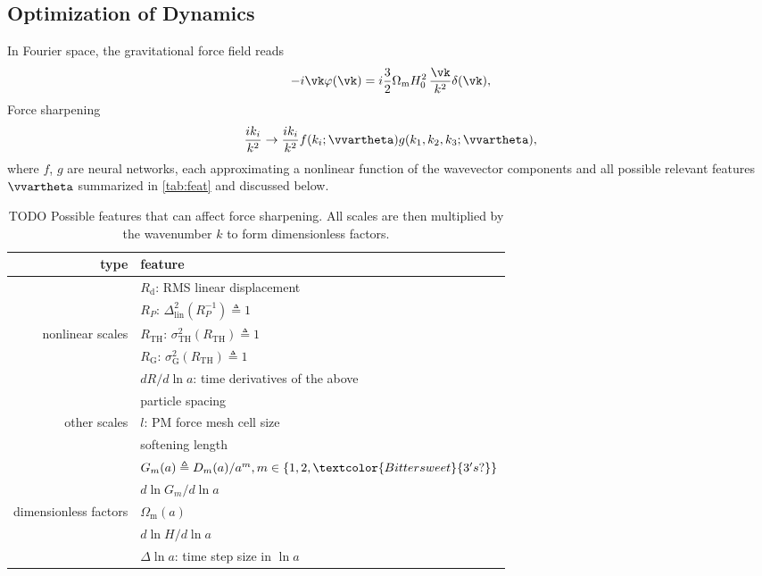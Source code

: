 \documentclass[modern, trackchanges, dvipsnames]{aastex631}
\renewcommand{\d}{d}
\newcommand{\lna}{\ln\!a}
\newcommand{\Omegam}{\Omega_\mathrm{m}}
\newcommand{\linear}{\mathrm{lin}}
\newcommand{\tophat}{\mathrm{TH}}
\newcommand{\gauss}{\mathrm{G}}
\newcommand{\YL}[1]{\textcolor{Bittersweet}{#1}}
\begin{document}
\vspace{1em}
\subsection{Optimization of Dynamics}
\label{sec:so}

In Fourier space, the gravitational force field reads
\begin{equation}
- i \vk \varphi(\vk) = i \frac32 \Omegam H_0^2 \,\frac{\vk}{k^2} \delta(\vk),
\end{equation}
Force sharpening
%
\begin{equation}
\frac{i k_i}{k^2} \to \frac{i k_i}{k^2}
  f(k_i; \vvartheta) g(k_1, k_2, k_3; \vvartheta),
\end{equation}
%
where $f$, $g$ are neural networks, each approximating a nonlinear
function of the wavevector components and all possible relevant features
$\vvartheta$ summarized in \autoref{tab:feat} and discussed below.

\begin{table}
\centering
\caption{TODO Possible features that can affect force sharpening.
All scales are then multiplied by the wavenumber $k$ to form dimensionless
factors.}
\label{tab:feat}
\begin{tabular}{rl}
\toprule
type & feature \\
\midrule
& $R_\mathrm{d}$: RMS linear displacement \\
\cmidrule(lr){2-2}
& $R_P$: $\Delta_\linear^2(R_P^{-1}) \triangleq 1$ \\
\cmidrule(lr){2-2}
nonlinear scales & $R_\tophat$: $\sigma_\tophat^2(R_\tophat) \triangleq 1$ \\
\cmidrule(lr){2-2}
& $R_\gauss$: $\sigma_\gauss^2(R_\tophat) \triangleq 1$ \\
\cmidrule(lr){2-2}
& $\d R / \d\lna$: time derivatives of the above \\
\midrule
& particle spacing \\
\cmidrule(lr){2-2}
other scales & $l$: PM force mesh cell size \\
\cmidrule(lr){2-2}
& softening length \\
\midrule
& $G_m(a) \triangleq D_m(a) / a^m, m \in \{1, 2, \YL{3's?}\}$ \\
\cmidrule(lr){2-2}
& $\d\ln G_m / \d\lna$ \\
\cmidrule(lr){2-2}
dimensionless factors & $\Omegam(a)$ \\
\cmidrule(lr){2-2}
& $\d\ln\!H / \d\lna$ \\
\cmidrule(lr){2-2}
& $\Delta\lna$: time step size in $\lna$ \\
\bottomrule
\end{tabular}
\end{table}
\end{document}
